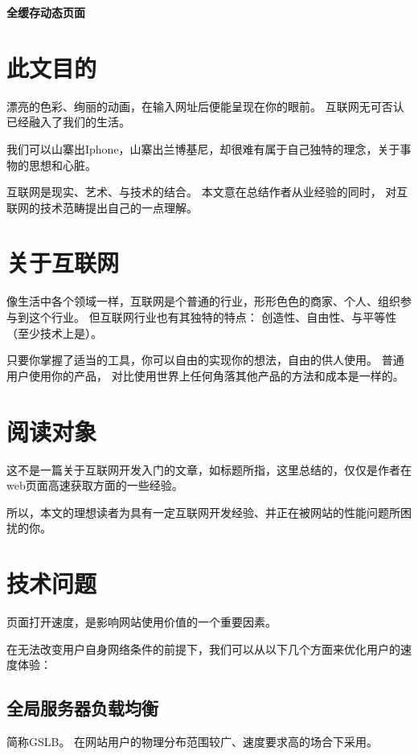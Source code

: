 \documentclass{article}
\begin{document}
  \begin{center}
    \huge \bf  全缓存动态页面
  \end{center}

  \tableofcontents
  \newpage
  
  \section{此文目的}
  漂亮的色彩、绚丽的动画，在输入网址后便能呈现在你的眼前。 互联网无可否认已经融入了我们的生活。

  我们可以山寨出Iphone，山寨出兰博基尼，却很难有属于自己独特的理念，关于事物的思想和心脏。

  互联网是现实、艺术、与技术的结合。 本文意在总结作者从业经验的同时，
  对互联网的技术范畴提出自己的一点理解。

  
  \section{关于互联网}
  像生活中各个领域一样，互联网是个普通的行业，形形色色的商家、个人、组织参与到这个行业。
  但互联网行业也有其独特的特点： 创造性、自由性、与平等性（至少技术上是）。

  只要你掌握了适当的工具，你可以自由的实现你的想法，自由的供人使用。 普通用户使用你的产品，
  对比使用世界上任何角落其他产品的方法和成本是一样的。
  

  \section{阅读对象}
  这不是一篇关于互联网开发入门的文章，如标题所指，这里总结的，仅仅是作者在web页面高速获取方面的一些经验。

  所以，本文的理想读者为具有一定互联网开发经验、并正在被网站的性能问题所困扰的你。

  \section{技术问题}

  页面打开速度，是影响网站使用价值的一个重要因素。

  在无法改变用户自身网络条件的前提下，我们可以从以下几个方面来优化用户的速度体验：

  \subsection{全局服务器负载均衡}

  简称GSLB。 在网站用户的物理分布范围较广、速度要求高的场合下采用。
\end{document}
